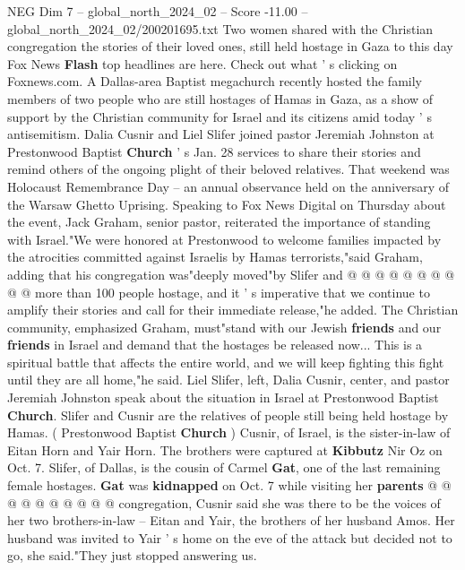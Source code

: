 \begin{textsample}{NEG Dim 7 – global\_north\_2024\_02 – Score -11.00 – global\_north\_2024\_02/200201695.txt}  \label{ex:f7_neg_281}
Two women shared with the Christian congregation the stories of their loved ones, still held hostage in Gaza to this day Fox News \textbf{Flash} top headlines are here.
Check out what ' s clicking on Foxnews.com.
A Dallas-area Baptist megachurch recently hosted the family members of two people who are still hostages of Hamas in Gaza, as a show of support by the Christian community for Israel and its citizens amid today ' s antisemitism.
Dalia Cusnir and Liel Slifer joined pastor Jeremiah Johnston at Prestonwood Baptist \textbf{Church} ' s Jan. 28 services to share their stories and remind others of the ongoing plight of their beloved relatives.
That weekend was Holocaust Remembrance Day -- an annual observance held on the anniversary of the Warsaw Ghetto Uprising.
Speaking to Fox News Digital on Thursday about the event, Jack Graham, senior pastor, reiterated the importance of standing with Israel."We were honored at Prestonwood to welcome families impacted by the atrocities committed against Israelis by Hamas terrorists,"said Graham, adding that his congregation was"deeply moved"by Slifer and @ @ @ @ @ @ @ @ @ @ more than 100 people hostage, and it ' s imperative that we continue to amplify their stories and call for their immediate release,"he added.
The Christian community, emphasized Graham, must"stand with our Jewish \textbf{friends} and our \textbf{friends} in Israel and demand that the hostages be released now...
This is a spiritual battle that affects the entire world, and we will keep fighting this fight until they are all home,"he said.
Liel Slifer, left, Dalia Cusnir, center, and pastor Jeremiah Johnston speak about the situation in Israel at Prestonwood Baptist \textbf{Church}.
Slifer and Cusnir are the relatives of people still being held hostage by Hamas. ( Prestonwood Baptist \textbf{Church} ) Cusnir, of Israel, is the sister-in-law of Eitan Horn and Yair Horn.
The brothers were captured at \textbf{Kibbutz} Nir Oz on Oct. 7.
Slifer, of Dallas, is the cousin of Carmel \textbf{Gat}, one of the last remaining female hostages. \textbf{Gat} was \textbf{kidnapped} on Oct. 7 while visiting her \textbf{parents} @ @ @ @ @ @ @ @ @ @ congregation, Cusnir said she was there to be the voices of her two brothers-in-law -- Eitan and Yair, the brothers of her husband Amos.
Her husband was invited to Yair ' s home on the eve of the attack but decided not to go, she said."They just stopped answering us.

\end{textsample}
